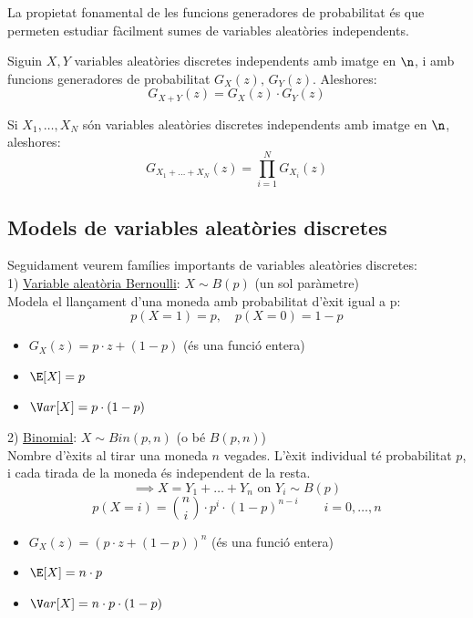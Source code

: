La propietat fonamental de les funcions generadores de probabilitat és que permeten estudiar fàcilment sumes de variables aleatòries independents.

\begin{prop}
  Siguin $X, Y$ variables aleatòries discretes independents amb imatge en $\n$, i amb funcions generadores de probabilitat $G_{X}(z), \, G_{Y}(z)$. Aleshores: 
  \[
    G_{X+Y}(z) = G_{X}(z)\cdot G_{Y}(z)
  \]
\end{prop}

\begin{col}
  Si $X_{1}, \ldots, X_{N}$ són variables aleatòries discretes independents amb imatge en $\n$, aleshores: 
  \[
    G_{X_{1}+\ldots+X_{N}}(z) = \prod_{i=1}^{N} G_{X_{i}}(z)
  \]
\end{col}

\subsection{Models de variables aleatòries discretes}

Seguidament veurem famílies importants de variables aleatòries discretes: \\

1) \underline{Variable aleatòria Bernoulli}: $X\sim B(p)$ \quad (un sol paràmetre) \\
Modela el llançament d'una moneda amb probabilitat d'èxit igual a p: 
\[
  p(X=1) = p, \quad p(X=0) = 1-p
\]
\begin{itemize}
    \item $G_{X}(z) = p\cdot z + (1-p)$ \quad (és una funció entera)
    \item $\E[X] = p$
    \item $\V ar[X] = p\cdot(1-p)$
\end{itemize}

\vspace{0.5cm}

2) \underline{Binomial}: $X\sim Bin(p,n)$ (o bé $B(p,n)$) \\
Nombre d'èxits al tirar una moneda $n$ vegades. L'èxit individual té probabilitat $p$, i cada tirada de la moneda és independent de la resta. 
\[
  \implies X=Y_{1}+\ldots+Y_{n} \text{ on } Y_{i}\sim B(p)
\]
\[
  p(X=i) = \binom{n}{i}\cdot p^{i}\cdot (1-p)^{n-i} \qquad i = 0,\ldots,n
\]
\begin{itemize}
    \item $G_{X}(z) = (p\cdot z + (1-p))^{n}$ \quad (és una funció entera)
    \item $\E[X] = n\cdot p$
    \item $\V ar[X] = n\cdot p\cdot (1-p)$
\end{itemize}


